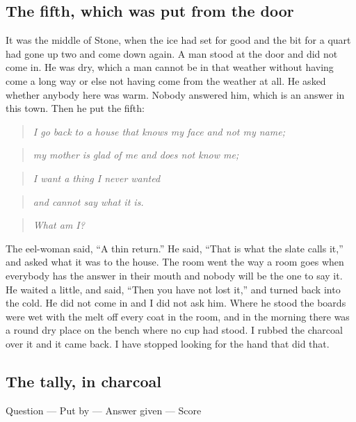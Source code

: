 \documentclass{design/chronicle}
\begin{document}
\subsection*{The fifth, which was put from the door}

It was the middle of Stone, when the ice had set for good and the bit for a quart had gone up two and come down again. A man stood at the door and did not come in. He was dry, which a man cannot be in that weather without having come a long way or else not having come from the weather at all. He asked whether anybody here was warm. Nobody answered him, which is an answer in this town. Then he put the fifth:

\begin{quote}\itshape I go back to a house that knows my face and not my name;\end{quote}

\begin{quote}\itshape my mother is glad of me and does not know me;\end{quote}

\begin{quote}\itshape I want a thing I never wanted\end{quote}

\begin{quote}\itshape and cannot say what it is.\end{quote}

\begin{quote}\itshape What am I?\end{quote}

The eel-woman said, “A thin return.” He said, “That is what the slate calls it,” and asked what it was to the house. The room went the way a room goes when everybody has the answer in their mouth and nobody will be the one to say it. He waited a little, and said, “Then you have not lost it,” and turned back into the cold. He did not come in and I did not ask him. Where he stood the boards were wet with the melt off every coat in the room, and in the morning there was a round dry place on the bench where no cup had stood. I rubbed the charcoal over it and it came back. I have stopped looking for the hand that did that.

\subsection*{The tally, in charcoal}

Question — Put by — Answer given — Score\par
\end{document}
